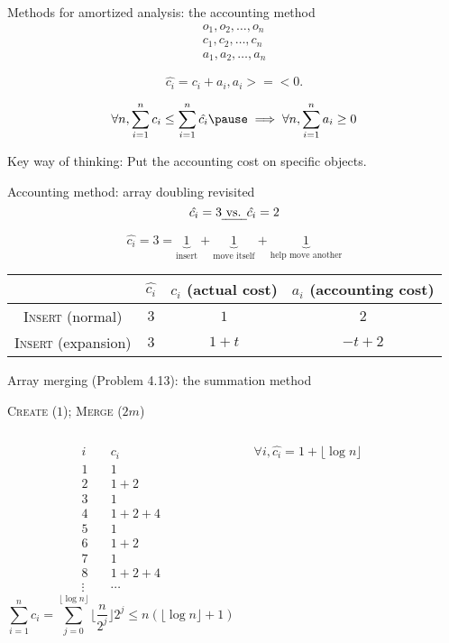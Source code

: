 \begin{frame}{Methods for amortized analysis: the accounting method}
  \begin{gather*}
	o_1, o_2, \ldots, o_n \\[5pt]
	c_1, c_2, \ldots, c_n \\[5pt]
	a_1, a_2, \ldots, a_n
  \end{gather*}

  \pause
  \[
    \hat{c_i} = c_i + a_i, a_i >=< 0. 
  \]

  \pause
  \[
	\forall n, \sum_{i=1}^{n} c_i \le \sum_{i=1}^{n} \hat{c_i} \pause \implies \forall n, \sum_{i=1}^{n} a_i \geq 0
  \]

  \pause
  \begin{alertblock}{Key way of thinking:}
	Put the accounting cost on specific objects.
  \end{alertblock}
\end{frame}
\begin{frame}{Accounting method: array doubling revisited}
  \[
    \hat{c_i} = 3 \text{\emph{ vs. }} \hat{c_i} = 2
  \]

  \pause
  \[
	\hat{c_i} = 3 = \underbrace{1}_{\textrm{insert}} +
	\underbrace{1}_{\textrm{move itself}} + \underbrace{1}_{\textrm{help move another}}
  \]

  \pause
  \begin{table}
    \begin{tabular}{c|ccc}
	  & $\hat{c_i}$ & $c_i$ (actual cost) & $a_i$ (accounting cost)
	  \\ \hline
	  \textsc{Insert} (normal) & $3$ & $1$ & $2$\\
	  \textsc{Insert} (expansion) & $3$ & $1 + t$ & $-t + 2$
    \end{tabular}
  \end{table}
\end{frame}
\begin{frame}{Array merging (Problem 4.13): the summation method}
  \centerline{\textsc{Create} ($1$); \textsc{Merge} ($2m$)}

  \begin{columns}
	  \pause
	  \begin{align*}
		i & \quad c_i \\
		1 & \quad 1  \\
		2 & \quad 1 + 2 \\
		3 & \quad 1 \\
		4 & \quad 1 + 2 + 4 \\
		5 & \quad 1 \\
		6 & \quad 1 + 2 \\
		7 & \quad 1 \\
		8 & \quad 1 + 2 + 4 \\
		\vdots & \quad \cdots
	  \end{align*}
	  \pause
	  \[
		\sum_{i=1}^{n} c_i = \sum_{j=0}^{\lfloor \log n \rfloor} \lfloor \frac{n}{2^j} \rfloor 2^j \le n (\lfloor \log n \rfloor + 1)
	  \]

	  \pause
	  \[
		\forall i, \hat{c_i} = 1 + \lfloor \log n \rfloor
	  \]
  \end{columns}
\end{frame}
